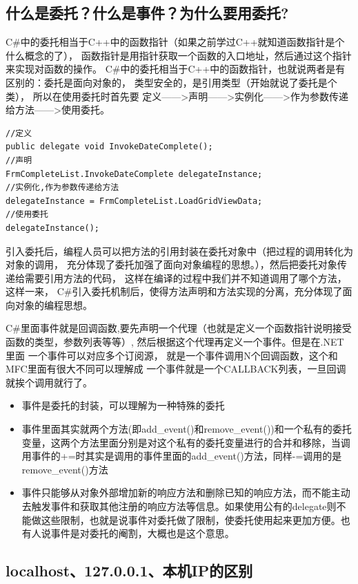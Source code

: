 \documentclass{book}
\begin{document}
\subsection{什么是委托？什么是事件？为什么要用委托?}

C\#中的委托相当于C++中的函数指针（如果之前学过C++就知道函数指针是个什么概念的了），
函数指针是用指针获取一个函数的入口地址，然后通过这个指针来实现对函数的操作。
C\#中的委托相当于C++中的函数指针，也就说两者是有区别的：委托是面向对象的，
类型安全的，是引用类型（开始就说了委托是个类），
所以在使用委托时首先要 定义——>声明——>实例化——>作为参数传递给方法——>使用委托。

\begin{lstlisting}[language={[Sharp]C}]
//定义
public delegate void InvokeDateComplete();
//声明
FrmCompleteList.InvokeDateComplete delegateInstance;
//实例化,作为参数传递给方法
delegateInstance = FrmCompleteList.LoadGridViewData;
//使用委托
delegateInstance();
\end{lstlisting}

引入委托后，编程人员可以把方法的引用封装在委托对象中（把过程的调用转化为对象的调用，
充分体现了委托加强了面向对象编程的思想。），然后把委托对象传递给需要引用方法的代码，
这样在编译的过程中我们并不知道调用了哪个方法，这样一来，
C\#引入委托机制后，使得方法声明和方法实现的分离，充分体现了面向对象的编程思想。

C\#里面事件就是回调函数,要先声明一个代理（也就是定义一个函数指针说明接受函数的类型，参数列表等等）,
然后根据这个代理再定义一个事件。但是在.NET里面 一个事件可以对应多个订阅源，
就是一个事件调用N个回调函数，这个和MFC里面有很大不同可以理解成 一个事件就是一个CALLBACK列表，一旦回调就挨个调用就行了。

\begin{itemize}
\item{事件是委托的封装，可以理解为一种特殊的委托}
\item{事件里面其实就两个方法(即add\_event()和remove\_event())和一个私有的委托变量，这两个方法里面分别是对这个私有的委托变量进行的合并和移除，当调用事件的+=时其实是调用的事件里面的add\_event()方法，同样-=调用的是remove\_event()方法}
\item{事件只能够从对象外部增加新的响应方法和删除已知的响应方法，而不能主动去触发事件和获取其他注册的响应方法等信息。如果使用公有的delegate则不能做这些限制，也就是说事件对委托做了限制，使委托使用起来更加方便。也有人说事件是对委托的阉割，大概也是这个意思。}
\end{itemize}

\subsection{localhost、127.0.0.1、本机IP的区别}
\end{document}
